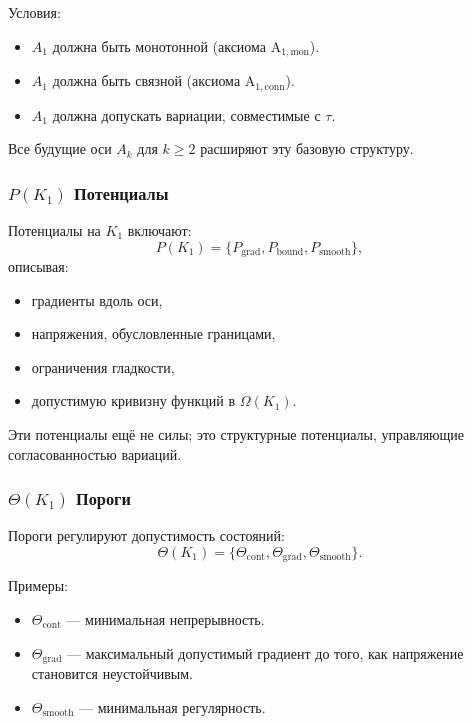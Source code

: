 Условия:
\begin{itemize}
    \item $A_1$ должна быть монотонной (аксиома A$_{1,\text{mon}}$).
    \item $A_1$ должна быть связной (аксиома A$_{1,\text{conn}}$).
    \item $A_1$ должна допускать вариации, совместимые с $\tau$.
\end{itemize}

Все будущие оси $A_k$ для $k \ge 2$ расширяют эту базовую структуру.

\subsubsection{\texorpdfstring{$P(K_1)$}{P(K_1)} Потенциалы}

Потенциалы на $K_1$ включают:
\[
P(K_1) = \{ P_{\mathrm{grad}}, P_{\mathrm{bound}}, P_{\mathrm{smooth}} \},
\]
описывая:
\begin{itemize}
    \item градиенты вдоль оси,
    \item напряжения, обусловленные границами,
    \item ограничения гладкости,
    \item допустимую кривизну функций в $\Omega(K_1)$.
\end{itemize}

Эти потенциалы ещё не силы; это структурные потенциалы, управляющие
согласованностью вариаций.

\subsubsection{\texorpdfstring{$\Theta(K_1)$}{\Theta(K_1)} Пороги}

Пороги регулируют допустимость состояний:
\[
\Theta(K_1) = \{ \Theta_{\mathrm{cont}}, \Theta_{\mathrm{grad}},
                 \Theta_{\mathrm{smooth}} \}.
\]

Примеры:
\begin{itemize}
    \item $\Theta_{\mathrm{cont}}$ — минимальная непрерывность.
    \item $\Theta_{\mathrm{grad}}$ — максимальный допустимый градиент до
          того, как напряжение становится неустойчивым.
    \item $\Theta_{\mathrm{smooth}}$ — минимальная регулярность.
\end{itemize}

